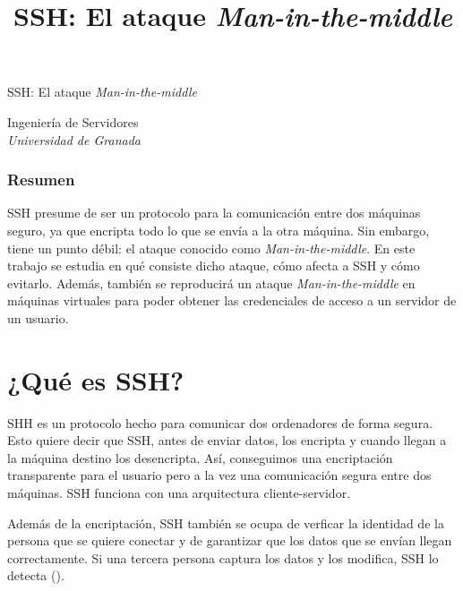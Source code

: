\documentclass[10pt,a4paper,spanish]{article}
\title{\Huge SSH: El ataque \textit{Man-in-the-middle}}
\begin{document}
\renewcommand{\tablename}{Tabla}

\begin{center}
{\Huge SSH: El ataque \textit{Man-in-the-middle}}\\[0.5cm]
\end{center}
{\large Ingeniería de Servidores}\\[0.5cm]
{\large \textit{Universidad de Granada}}
\begin{center}
\subsubsection*{Resumen}
\begin{minipage}{0.7\textwidth}
{\small SSH presume de ser un protocolo para la comunicación entre dos máquinas seguro, ya que encripta todo lo que se envía a la otra máquina. Sin embargo, tiene un punto débil: el ataque conocido como \textit{Man-in-the-middle}. En este trabajo se estudia en qué consiste dicho ataque, cómo afecta a SSH y cómo evitarlo. Además, también se reproducirá un ataque \textit{Man-in-the-middle} en máquinas virtuales para poder obtener las credenciales de acceso a un servidor de un usuario.}
\end{minipage}
\end{center}

\section{¿Qué es SSH?}
SHH es un protocolo hecho para comunicar dos ordenadores de forma segura. Esto quiere decir que SSH, antes de enviar datos, los encripta y cuando llegan a la máquina destino los desencripta. Así, conseguimos una encriptación transparente para el usuario pero a la vez una comunicación segura entre dos máquinas. SSH funciona con una arquitectura cliente-servidor.

Además de la encriptación, SSH también se ocupa de verficar la identidad de la persona que se quiere conectar y de garantizar que los datos que se envían llegan correctamente. Si una tercera persona captura los datos y los modifica, SSH lo detecta (\cite{sshbiblio}).
\end{document}
